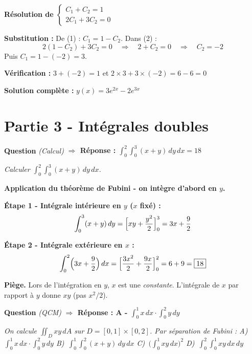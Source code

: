 \documentclass[11pt,a4paper]{article}
\newcounter{qnum}
\newcommand{\qtitre}[2]{%
  \stepcounter{qnum}%
  \medskip\noindent
  \textbf{\color{bleutexte}Question \theqnum}\enspace
  \textit{(#1)}\enspace
  \textcolor{vertok}{\textbf{$\Rightarrow$ Réponse : #2}}
  \par\smallskip
}
\newcommand{\qenonce}[1]{%
  \begin{mdframed}[backgroundcolor=grisbox, linewidth=0pt,
    innerleftmargin=8pt, innerrightmargin=8pt,
    innertopmargin=5pt, innerbottommargin=5pt,
    skipabove=2pt, skipbelow=4pt]
  \small\textit{#1}
  \end{mdframed}
}
\begin{document}
\begin{reponsebox}
\textbf{Résolution de $\begin{cases}C_1+C_2 = 1\\ 2C_1+3C_2 = 0\end{cases}$}

\textbf{Substitution :} De (1) : $C_1 = 1 - C_2$. Dans (2) :
$$2(1 - C_2) + 3C_2 = 0 \quad\Rightarrow\quad 2 + C_2 = 0 \quad\Rightarrow\quad \boxed{C_2 = -2}$$
Puis $C_1 = 1 - (-2) = \boxed{3}$.

\textbf{Vérification :} $3 + (-2) = 1$ \checkmark \quad et \quad $2\times 3 + 3\times(-2) = 6 - 6 = 0$ \checkmark

\textbf{Solution complète :} $y(x) = 3e^{2x} - 2e^{3x}$
\end{reponsebox}

\section{Partie 3 - Intégrales doubles}

\qtitre{Calcul}{$\displaystyle\int_0^2\!\int_0^3(x+y)\,dy\,dx = 18$}
\qenonce{Calculer $\displaystyle\int_0^2\!\int_0^3 (x+y)\,dy\,dx$.}

\begin{reponsebox}
\textbf{Application du théorème de Fubini - on intègre d'abord en $y$.}

\textbf{Étape 1 - Intégrale intérieure en $y$ ($x$ fixé) :}
$$\int_0^3 (x+y)\,dy = \Bigl[xy + \frac{y^2}{2}\Bigr]_0^3 = 3x + \frac{9}{2}$$

\textbf{Étape 2 - Intégrale extérieure en $x$ :}
$$\int_0^2 \Bigl(3x + \frac{9}{2}\Bigr)\,dx = \Bigl[\frac{3x^2}{2} + \frac{9x}{2}\Bigr]_0^2 = 6 + 9 = \boxed{18}$$
\end{reponsebox}

\begin{piegebox}
\textbf{Piège.} Lors de l'intégration en $y$, $x$ est une \emph{constante}. L'intégrale de $x$ par rapport à $y$ donne $xy$ (pas $x^2/2$).
\end{piegebox}

\qtitre{QCM}{A - $\int_0^1 x\,dx \cdot \int_0^2 y\,dy$}
\qenonce{On calcule $\iint_D xy\,dA$ sur $D=[0,1]\times[0,2]$. Par séparation de Fubini :
\quad A)~$\int_0^1 x\,dx\cdot\int_0^2 y\,dy$ \quad B)~$\int_0^1\int_0^2(x+y)\,dy\,dx$ \quad C)~$\bigl(\int_0^1 xy\,dx\bigr)^2$ \quad D)~$\int_0^2\int_0^1 xy\,dx\,dy$}
\end{document}
